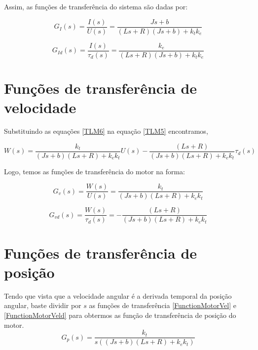 \documentclass[]{politex}
\begin{document}
    Assim, as funções de transferência do sistema são dadas por:

    \begin{equation}
    \label{functionTransferMotor}
        G_{I}(s) = \frac{I(s)}{U(s)} = \frac{J s+b}{(L s + R) (J s+b)+k_{t}k_{e}}
    \end{equation}

    \begin{equation}
    \label{functionTransferDist}
        G_{Id}(s) = \frac{I(s)}{\tau_{d}(s)} = \frac{k_{e}}{(L s + R)( J s+b)+k_{t}k_{e}}
    \end{equation}

\section{Funções de transferência de velocidade}

Substituindo as equações \eqref{TLM6} na equação \eqref{TLM5} encontramos,

    \begin{equation}
     W(s) = \frac{k_{t}}{(J s + b)(L s + R) + k_{e} k_{t}} U(s) - \frac{(L s + R)}{(J s + b)(L s + R) + k_{e} k_{t}} \tau_d(s)
    \end{equation}

    Logo, temos as funções de transferência do motor na forma:
    
    \begin{equation}
    \label{FunctionMotorVel}
     G_v(s) = \frac{W(s)}{U(s)} = \frac{k_{t}}{(J s + b)(L s + R) + k_{e} k_{t}} 
    \end{equation}
    
    \begin{equation}
    \label{FunctionMotorVeld}
     G_{vd}(s) = \frac{W(s)}{\tau_{d}(s)} = - \frac{(L s + R)}{(J s + b)(L s + R) + k_{e} k_{t}}
    \end{equation}
    
\section{Funções de transferência de posição}

Tendo que vista que a velocidade angular é a derivada temporal da posição angular, baste dividir por $s$ as funções de transferência \eqref{FunctionMotorVel} e \eqref{FunctionMotorVeld} para obtermos as função de transferência de posição do motor.
    \begin{equation}
    \label{FunctionMotor}
     G_p(s) = \frac{k_{t}}{s((J s + b)(L s + R) + k_{e} k_{t})}
    \end{equation}
    
\end{document}
